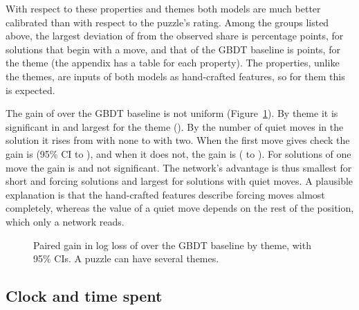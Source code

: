 \documentclass[11pt]{article}
\begin{document}
With respect to these properties and themes both models are much better
calibrated than with respect to the puzzle's rating. Among the groups listed
above, the largest deviation of  from the observed share
is  percentage points, for
solutions that begin with a 
move, and that of the GBDT baseline is 
points, for the theme  (the
appendix has a table for each property). The properties, unlike the themes,
are inputs of both models as hand-crafted features, so for them this is
expected.

The gain of  over the GBDT baseline is not uniform
(Figure~\ref{fig:themes}). By theme it is significant in
 and largest for the theme 
(). By the number of quiet moves in the
solution it rises from  with none to
 with two. When the first move gives check the gain is
 (95\% CI  to
), and when it does not, the gain is
 ( to
). For solutions of one move the gain is
 and not significant. The network's advantage is thus
smallest for short and forcing solutions and largest for solutions with
quiet moves. A plausible explanation is that the hand-crafted features
describe forcing moves almost completely, whereas the value of a quiet move
depends on the rest of the position, which only a network reads.

\begin{figure}[htbp]\centering
{}
\caption{Paired gain in log loss of  over the GBDT
baseline by theme, with 95\% CIs. A puzzle can have several themes.}
\label{fig:themes}
\end{figure}

\subsection{Clock and time spent}
\label{sec:time}
\end{document}
